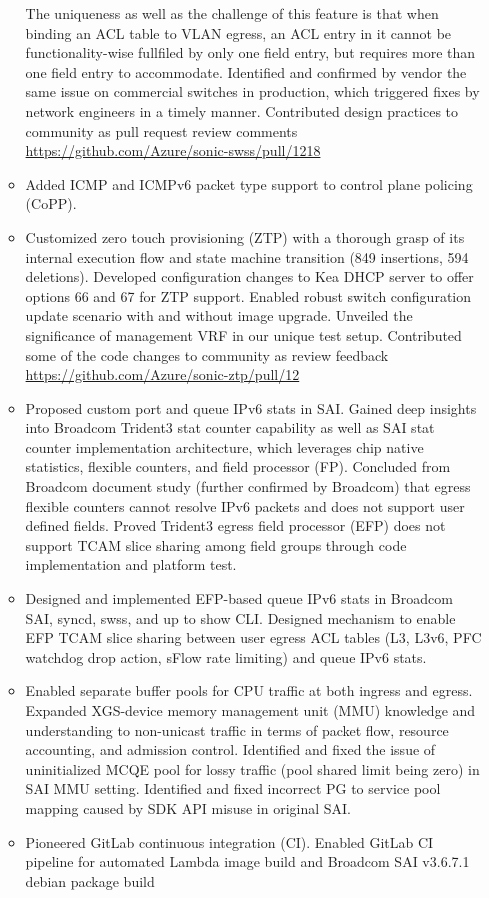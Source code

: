 \documentclass[letterpaper,11pt]{article}
\newcommand{\resitem}[1]{\item #1 \vspace{-2pt}}
\begin{document}
\begin{itemize}
\begin{itemize}
{  The uniqueness as well as the challenge of this feature is that when binding an ACL table to VLAN egress, an ACL entry in it
  cannot be functionality-wise fullfiled by only one field entry, but requires more than one field entry to accommodate.
  Identified and confirmed by vendor the same issue on commercial switches in production, which triggered fixes by network engineers
  in a timely manner.
  Contributed design practices to community as pull request review comments \url{https://github.com/Azure/sonic-swss/pull/1218}}
  \resitem{Added ICMP and ICMPv6 packet type support to control plane policing (CoPP).}
  \resitem{Customized zero touch provisioning (ZTP) with a thorough grasp of its internal execution flow and state machine
  transition (849 insertions, 594 deletions).
  Developed configuration changes to Kea DHCP server to offer options 66 and 67 for ZTP support.
  Enabled robust switch configuration update scenario with and without image upgrade.
  Unveiled the significance of management VRF in our unique test setup.
  Contributed some of the code changes to community as review feedback \url{https://github.com/Azure/sonic-ztp/pull/12}}
  \resitem{Proposed custom port and queue IPv6 stats in SAI. Gained deep insights into Broadcom Trident3 stat counter capability
  as well as SAI stat counter implementation architecture, which leverages chip native statistics, flexible counters, and field processor (FP).
  Concluded from Broadcom document study (further confirmed by Broadcom) that egress flexible counters cannot resolve IPv6 packets
  and does not support user defined fields.
  Proved Trident3 egress field processor (EFP) does not support TCAM slice sharing among field groups through code implementation and platform test.}
  \resitem{Designed and implemented EFP-based queue IPv6 stats in Broadcom SAI, syncd, swss, and up to show CLI.
  Designed mechanism to enable EFP TCAM slice sharing between user egress ACL tables (L3, L3v6, PFC watchdog drop action, sFlow rate limiting)
  and queue IPv6 stats.}
  \resitem{Enabled separate buffer pools for CPU traffic at both ingress and egress. Expanded XGS-device memory management unit (MMU)
  knowledge and understanding to
  non-unicast traffic in terms of packet flow, resource accounting, and admission control.
  Identified and fixed the issue of uninitialized MCQE pool for lossy traffic (pool shared limit being zero) in SAI MMU setting.
  Identified and fixed incorrect PG to service pool mapping caused by SDK API misuse in original SAI.}
  \resitem{Pioneered GitLab continuous integration (CI). Enabled GitLab CI pipeline for automated Lambda image build and Broadcom SAI v3.6.7.1 debian package build
}
\end{itemize}
\end{itemize}
\end{document}
